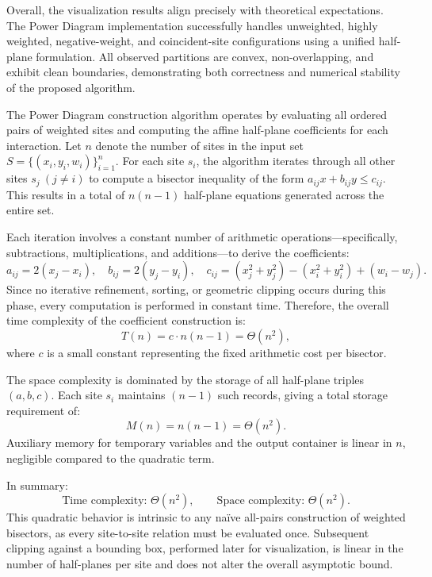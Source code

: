 \documentclass{article}
\begin{document}
Overall, the visualization results align precisely with theoretical expectations.  
The Power Diagram implementation successfully handles unweighted, highly weighted, negative-weight, and coincident-site configurations using a unified half-plane formulation.  
All observed partitions are convex, non-overlapping, and exhibit clean boundaries, demonstrating both correctness and numerical stability of the proposed algorithm.



The Power Diagram construction algorithm operates by evaluating all ordered pairs of weighted sites and computing the affine half-plane coefficients for each interaction.  
Let \(n\) denote the number of sites in the input set \(S=\{(x_i,y_i,w_i)\}_{i=1}^n\).  
For each site \(s_i\), the algorithm iterates through all other sites \(s_j\ (j\neq i)\) to compute a bisector inequality of the form \(a_{ij}x+b_{ij}y\le c_{ij}\).  
This results in a total of \(n(n-1)\) half-plane equations generated across the entire set.

Each iteration involves a constant number of arithmetic operations—specifically, subtractions, multiplications, and additions—to derive the coefficients:
\[
a_{ij}=2(x_j-x_i),\quad b_{ij}=2(y_j-y_i),\quad
c_{ij}=(x_j^2+y_j^2)-(x_i^2+y_i^2)+(w_i-w_j).
\]
Since no iterative refinement, sorting, or geometric clipping occurs during this phase, every computation is performed in constant time.  
Therefore, the overall time complexity of the coefficient construction is:
\[
T(n) = c \cdot n(n-1) = \Theta(n^2),
\]
where \(c\) is a small constant representing the fixed arithmetic cost per bisector.

The space complexity is dominated by the storage of all half-plane triples \((a,b,c)\).  
Each site \(s_i\) maintains \((n-1)\) such records, giving a total storage requirement of:
\[
M(n) = n(n-1) = \Theta(n^2).
\]
Auxiliary memory for temporary variables and the output container is linear in \(n\), negligible compared to the quadratic term.

In summary:
\[
\text{Time complexity: } \Theta(n^2), \qquad
\text{Space complexity: } \Theta(n^2).
\]
This quadratic behavior is intrinsic to any naïve all-pairs construction of weighted bisectors, as every site-to-site relation must be evaluated once.  
Subsequent clipping against a bounding box, performed later for visualization, is linear in the number of half-planes per site and does not alter the overall asymptotic bound.
\end{document}
